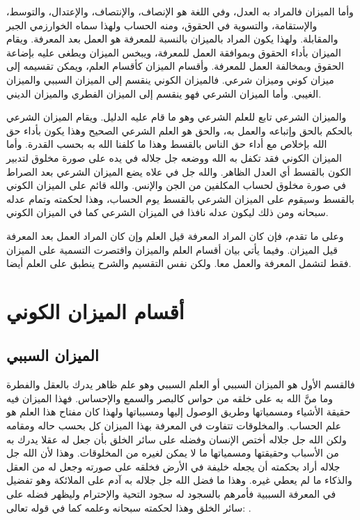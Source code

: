 وأما الميزان فالمراد به العدل، وفي اللغة هو الإنصاف، والإنتصاف، والإعتدال، والتوسط، والإستقامة، والتسوية في الحقوق، ومنه الحساب ولهذا سماه الخوارزمي الجبر والمقابلة. ولهذا يكون المراد بالميزان بالنسبة للمعرفة هو العمل بعد المعرفة. ويقام الميزان بأداء الحقوق وبموافقة العمل للمعرفة، ويبخس الميزان ويطغى عليه بإضاعة الحقوق وبمخالفة العمل للمعرفة. وأقسام الميزان كأقسام العلم، ويمكن تقسيمه إلى ميزان كوني وميزان شرعي. فالميزان الكوني ينقسم إلى الميزان السببي والميزان الغيبي. وأما الميزان الشرعي فهو ينقسم إلى الميزان الفطري والميزان الديني. 

والميزان الشرعي تابع للعلم الشرعي وهو ما قام عليه الدليل. ويقام الميزان الشرعي بالحكم بالحق وإتباعه والعمل به، والحق هو العلم الشرعي الصحيح وهذا يكون بأداء حق الله بإخلاص مع أداء حق الناس بالقسط وهذا ما كلفنا الله به بحسب القدرة. وأما الميزان الكوني فقد تكفل به الله ووضعه جل جلاله في يده على صورة مخلوق لتدبير الكون بالقسط أي العدل الظاهر. والله جل في علاه يضع الميزان الشرعي بعد الصراط في صورة مخلوق لحساب المكلفين من الجن والإنس. والله قائم على الميزان الكوني بالقسط وسيقوم على الميزان الشرعي بالقسط يوم الحساب، وهذا لحكمته وتمام عدله سبحانه ومن ذلك ليكون عدله نافذا في الميزان الشرعي كما في الميزان الكوني.

وعلى ما تقدم، فإن كان المراد المعرفة قيل العلم وإن كان المراد العمل بعد المعرفة قيل الميزان. وفيما يأتي بيان أقسام العلم والميزان واقتصرت التسمية على الميزان فقط لتشمل المعرفة والعمل معا. ولكن نفس التقسيم والشرح ينطبق على العلم أيضا.

\section{أقسام الميزان الكوني}

\subsection{الميزان السببي}

فالقسم الأول هو الميزان السببي أو العلم السببي وهو علم ظاهر يدرك بالعقل والفطرة وما منَّ الله به على خلقه من حواس كالبصر والسمع والإحساس. فهذا الميزان فيه حقيقة الأشياء ومسمياتها وطريق الوصول إليها ومسبباتها ولهذا كان مفتاح هذا العلم هو علم الحساب. والمخلوقات تتفاوت في المعرفة بهذا الميزان كل بحسب حاله ومقامه ولكن الله جل جلاله أختص الإنسان وفضله على سائر الخلق بأن جعل له عقلا يدرك به من الأسباب وحقيقتها ومسمياتها ما لا يمكن لغيره من المخلوقات. وهذا لأن الله جل جلاله أراد بحكمته أن يجعله خليفة في الأرض فخلقه على صورته وجعل له من العقل والذكاء ما لم يعطي غيره. وهذا ما فضل الله جل جلاله به آدم على الملائكة وهو تفضيل في المعرفة السببية فأمرهم بالسجود له سجود التحية والإحترام وليظهر فضله على سائر الخلق وهذا لحكمته سبحانه وعلمه كما في قوله تعالى:
\quranayah*[2][30-34]{\footnotesize \surahname*[2]}.

